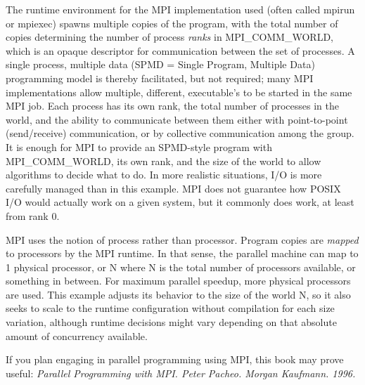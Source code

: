 The runtime environment for the MPI implementation used (often called mpirun or
mpiexec) spawns multiple copies of the program, with the total number of copies
determining the number of process \emph{ranks} in MPI\_COMM\_WORLD, which is
an opaque descriptor for communication between the set of processes. A single
process, multiple data (SPMD = Single Program, Multiple Data) programming model
is thereby facilitated, but not required; many MPI implementations allow
multiple, different, executable's to be started in the same MPI job. Each
process has its own rank, the total number of processes in the world, and the
ability to communicate between them either with point-to-point (send/receive)
communication, or by collective communication among the group. It is enough for
MPI to provide an SPMD-style program with MPI\_COMM\_WORLD, its own rank, and
the size of the world to allow algorithms to decide what to do. In more
realistic situations, I/O is more carefully managed than in this example. MPI
does not guarantee how POSIX I/O would actually work on a given system, but it
commonly does work, at least from rank 0.

MPI uses the notion of process rather than processor. Program copies are
\emph{mapped} to processors by the MPI runtime. In that sense, the parallel
machine can map to 1 physical processor, or N where N is the total number of
processors available, or something in between. For maximum parallel speedup,
more physical processors are used. This example adjusts its behavior to the
size of the world N, so it also seeks to scale to the runtime configuration
without compilation for each size variation, although runtime decisions might
vary depending on that absolute amount of concurrency available.


 If you plan engaging in parallel programming using MPI, this
book may prove useful: \emph{Parallel Programming with MPI. Peter Pacheo.
Morgan Kaufmann. 1996.}
